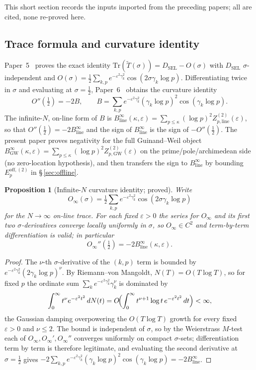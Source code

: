 \documentclass[11pt]{article}
\newtheorem{proposition}[theorem]{Proposition}
\newcommand{\Tt}{\widetilde{T}}
\newcommand{\DSEL}{D_{\mathrm{SEL}}}
\newcommand{\BinfGW}{B_{\mathrm{GW}}^{\infty}}   %
\newcommand{\Binfline}{B_{\mathrm{line}}^{\infty}} %
\newcommand{\ZtwoGW}{Z_{p,\mathrm{GW}}^{(2)}}   %
\newcommand{\Ztwoline}{Z_{p,\mathrm{line}}^{(2)}} %
\newcommand{\Eoff}{E_p^{\mathrm{off},(2)}}  %
\begin{document}
This short section records the inputs imported from the preceding papers;
all are cited, none re-proved here.

\subsection{Trace formula and curvature identity}

Paper~5~\cite{Paper5} proves the exact identity
$\mathrm{Tr}(\Tt(\sigma))=\DSEL-O(\sigma)$ with $\DSEL$ $\sigma$-independent
and
$O(\sigma)=\tfrac12\sum_{k,p}e^{-\varepsilon^2\gamma_k^2}
\cos(2\sigma\gamma_k\log p)$.
Differentiating twice in $\sigma$ and evaluating at $\sigma=\tfrac12$,
Paper~6~\cite{Paper6} obtains the curvature identity
\[
O''(\tfrac12) = -2B,
\qquad
B = \sum_{k,p}e^{-\varepsilon^2\gamma_k^2}(\gamma_k\log p)^2
   \cos(\gamma_k\log p).
\]
The infinite-$N$, on-line form of $B$ is
$\Binfline(\kappa,\varepsilon)=\sum_{p\le\kappa}(\log p)^2\Ztwoline(\varepsilon)$,
so that $O''(\tfrac12)=-2\Binfline$ and the sign of $\Binfline$ is the sign
of $-O''(\tfrac12)$.
The present paper proves negativity for the full Guinand--Weil object
$\BinfGW(\kappa,\varepsilon)=\sum_{p\le\kappa}(\log p)^2\ZtwoGW(\varepsilon)$
on the prime/pole/archimedean side (no zero-location hypothesis), and then
transfers the sign to $\Binfline$ by bounding $\Eoff$ in
\S\,\ref{sec:offline}.

\begin{proposition}[Infinite-$N$ curvature identity; proved]\label{prop:infN}
Write
\[
O_\infty(\sigma)=\tfrac12\sum_{k,p}e^{-\varepsilon^2\gamma_k^2}
\cos(2\sigma\gamma_k\log p)
\]
for the $N\to\infty$ on-line trace. For each fixed
$\varepsilon>0$ the series for $O_\infty$ and its first two $\sigma$-derivatives
converge locally uniformly in $\sigma$, so $O_\infty\in C^2$ and term-by-term
differentiation is valid; in particular
\[
O_\infty''(\tfrac12)=-2\Binfline(\kappa,\varepsilon).
\]
\end{proposition}

\begin{proof}
The $\nu$-th $\sigma$-derivative of the $(k,p)$ term is bounded by
$e^{-\varepsilon^2\gamma_k^2}(2\gamma_k\log p)^\nu$. By Riemann--von Mangoldt,
$N(T)=O(T\log T)$, so for fixed $p$ the ordinate sum
$\sum_k e^{-\varepsilon^2\gamma_k^2}\gamma_k^{\nu}$ is dominated by
\[
\int_0^\infty t^\nu e^{-\varepsilon^2 t^2}\,dN(t)
=O\!\Bigl(\int_0^\infty t^{\nu+1}\log t\,e^{-\varepsilon^2 t^2}\,dt\Bigr)<\infty,
\]
the Gaussian damping overpowering the $O(T\log T)$ growth for every fixed
$\varepsilon>0$ and $\nu\le 2$. The bound is independent of $\sigma$, so by the
Weierstrass $M$-test each of $O_\infty,O_\infty',O_\infty''$ converges
uniformly on compact $\sigma$-sets; differentiation term by term is therefore
legitimate, and evaluating the second derivative at $\sigma=\tfrac12$ gives
$-2\sum_{k,p}e^{-\varepsilon^2\gamma_k^2}(\gamma_k\log p)^2\cos(\gamma_k\log p)
=-2\Binfline$.
\end{proof}
\end{document}
